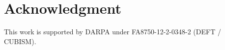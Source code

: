 \section*{Acknowledgment}

This work is supported by DARPA under FA8750-12-2-0348-2 (DEFT
/ CUBISM).
